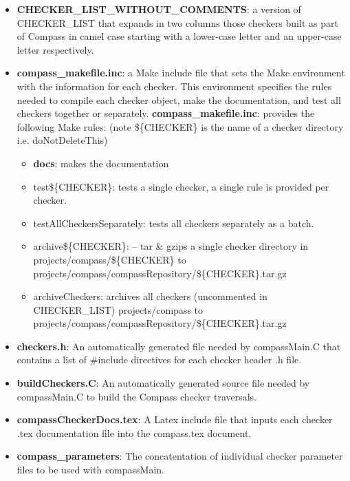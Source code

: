 \begin{itemize}
\item {\bf CHECKER\_LIST\_WITHOUT\_COMMENTS}: a version of CHECKER\_LIST
	that expands in two columns those checkers built as part of Compass
	in camel case starting with a lower-case letter and an upper-case
	letter respectively.
\item {\bf compass\_makefile.inc}: a Make include file that sets the Make environment
	with the information for each checker. This environment specifies
	the rules needed to compile each checker object, make the
	documentation, and test all checkers together or separately.
   {\bf compass\_makefile.inc}: provides the following Make rules: 
	(note \$\{CHECKER\} is the name of a checker directory i.e. 
	doNotDeleteThis)
   \begin{itemize}
      \item {\bf docs}:  makes the documentation

      \item test\$\{CHECKER\}: tests a single checker, a single rule is provided
		      per checker.

      \item testAllCheckersSeparately: tests all checkers separately as a batch.

      \item archive\$\{CHECKER\}: -- tar \& gzips a single checker directory in 
		projects/compass/\$\{CHECKER\} to 
		projects/compass/compassRepository/\$\{CHECKER\}.tar.gz

      \item archiveCheckers: archives all checkers (uncommented in CHECKER\_LIST)
                projects/compass to
                projects/compass/compassRepository/\$\{CHECKER\}.tar.gz
   \end{itemize}

\item {\bf checkers.h}: An automatically generated file needed by compassMain.C that 
	contains a list of \#include directives for each checker header .h file.

\item {\bf buildCheckers.C}: An automatically generated source file needed by 
	compassMain.C to build the Compass checker traversals.

\item {\bf compassCheckerDocs.tex}: A Latex include file that inputs each checker .tex
	documentation file into the compass.tex document.

\item {\bf compass\_parameters}: The concatentation of individual checker parameter files
	to be used with compassMain.

\end{itemize}



